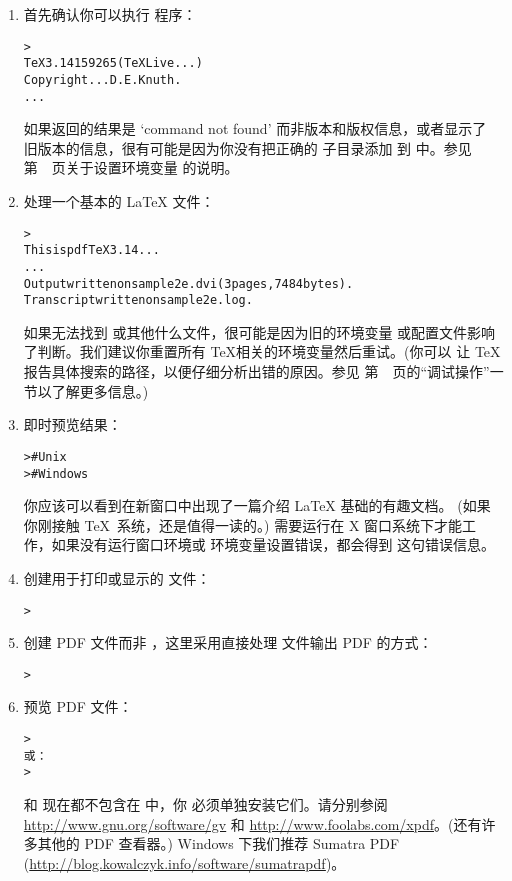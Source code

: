 \documentclass{article}
\begin{document}
\begin{enumerate}

\item 首先确认你可以执行  程序：
\begin{alltt}
> 
TeX 3.14159265 (TeX Live ...)
Copyright ... D.E. Knuth.
...
\end{alltt}
如果返回的结果是 `command not found' 而非版本和版权信息，或者显示了
旧版本的信息，很有可能是因为你没有把正确的  子目录添加
到  中。参见第~\pageref{sec:env}~页关于设置环境变量
的说明。

\item 处理一个基本的 \LaTeX{} 文件：
\begin{alltt}
> 
This is pdfTeX 3.14...
...
Output written on sample2e.dvi (3 pages, 7484 bytes).
Transcript written on sample2e.log.
\end{alltt}
如果无法找到  或其他什么文件，很可能是因为旧的环境变量
或配置文件影响了判断。我们建议你重置所有 \TeX 相关的环境变量然后重试。(你可以
让 \TeX{} 报告具体搜索的路径，以便仔细分析出错的原因。参见
第~\pageref{sec:debugging}~页的``调试操作''一节以了解更多信息。)

\item 即时预览结果：
\begin{alltt}
>     # Unix
>   # Windows
\end{alltt}
你应该可以看到在新窗口中出现了一篇介绍 \LaTeX{} 基础的有趣文档。
(如果你刚接触 \TeX\ 系统，还是值得一读的。) 
需要运行在 X 窗口系统下才能工作，如果没有运行窗口环境或
 环境变量设置错误，都会得到
 这句错误信息。

\item 创建用于打印或显示的 \PS{} 文件：
\begin{alltt}
> 
\end{alltt}

\item 创建 PDF 文件而非 \dvi{}，这里采用直接处理 
文件输出 PDF 的方式：
\begin{alltt}
> 
\end{alltt}

\item 预览 PDF 文件：
\begin{alltt}
> 
\textrm{或：}
> 
\end{alltt}
 和  现在都不包含在 \TL{} 中，你
必须单独安装它们。请分别参阅 \url{http://www.gnu.org/software/gv} 和
\url{http://www.foolabs.com/xpdf}。(还有许多其他的 PDF 查看器。)
Windows 下我们推荐 Sumatra PDF (\url{http://blog.kowalczyk.info/software/sumatrapdf})。


\end{enumerate}
\end{document}
